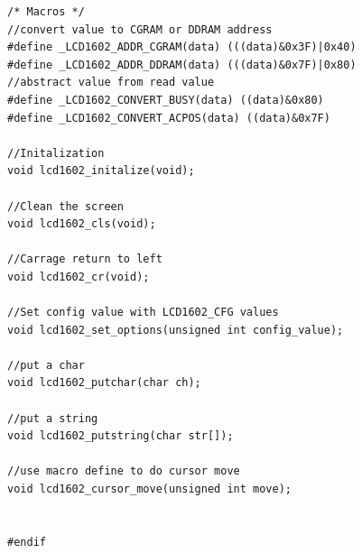 \documentclass[a4paper]{ctexart}
\begin{document}
\begin{lstlisting}[caption={File lcd1602\_driver.h},label={lcd1602dh}]
/* Macros */
//convert value to CGRAM or DDRAM address
#define _LCD1602_ADDR_CGRAM(data) (((data)&0x3F)|0x40)
#define _LCD1602_ADDR_DDRAM(data) (((data)&0x7F)|0x80)
//abstract value from read value
#define _LCD1602_CONVERT_BUSY(data) ((data)&0x80)
#define _LCD1602_CONVERT_ACPOS(data) ((data)&0x7F)

//Initalization
void lcd1602_initalize(void);

//Clean the screen
void lcd1602_cls(void);

//Carrage return to left
void lcd1602_cr(void);

//Set config value with LCD1602_CFG values
void lcd1602_set_options(unsigned int config_value);

//put a char
void lcd1602_putchar(char ch);

//put a string
void lcd1602_putstring(char str[]);

//use macro define to do cursor move
void lcd1602_cursor_move(unsigned int move);


#endif
\end{lstlisting}
\end{document}
